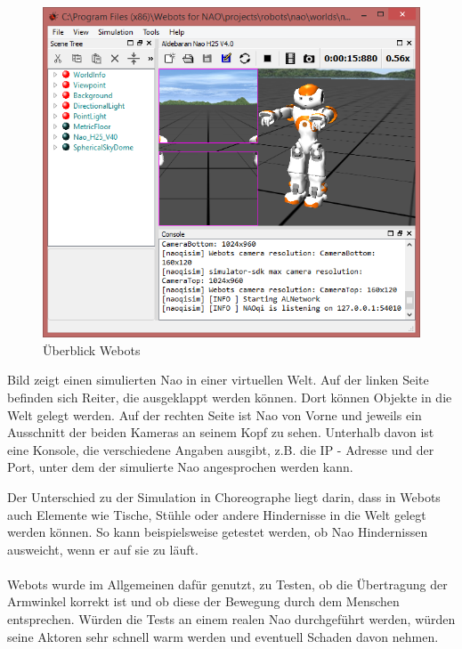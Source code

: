 \begin{figure}[H]						
	\centering							
	\includegraphics[scale=1.0]{Bilder/webots.png}			
	\caption{Überblick Webots}						
	\label{f:nao_webots}						
\end{figure}
\noindent
Bild  zeigt einen simulierten Nao in einer virtuellen Welt. Auf der linken Seite befinden sich Reiter, die ausgeklappt werden können. Dort können Objekte in die Welt gelegt werden. Auf der rechten Seite ist Nao von Vorne und jeweils ein Ausschnitt der beiden Kameras an seinem Kopf zu sehen. Unterhalb davon ist eine Konsole, die verschiedene Angaben ausgibt, z.B. die IP - Adresse und der Port, unter dem der simulierte Nao angesprochen werden kann.

Der Unterschied zu der Simulation in Choreographe liegt darin, dass in Webots auch Elemente wie Tische, Stühle oder andere Hindernisse in die Welt gelegt werden können. So kann beispielsweise getestet werden, ob Nao Hindernissen ausweicht, wenn er auf sie zu läuft.
\\
\\
Webots wurde im Allgemeinen dafür genutzt, zu Testen, ob die Übertragung der Armwinkel korrekt ist und ob diese der Bewegung durch dem Menschen entsprechen. Würden die Tests an einem realen Nao durchgeführt werden, würden seine Aktoren sehr schnell warm werden und eventuell Schaden davon nehmen.





